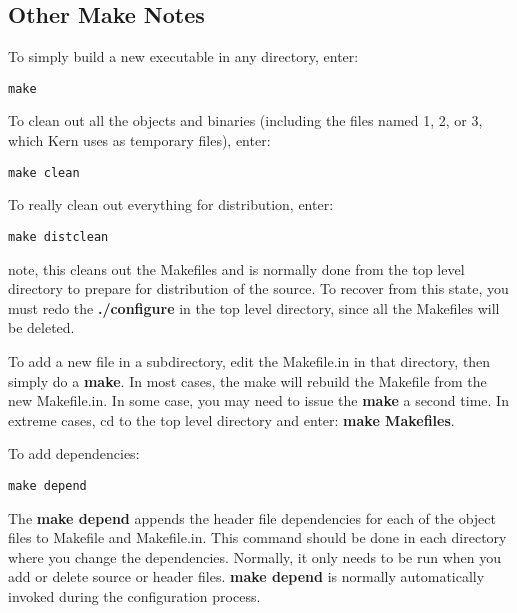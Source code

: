 {{{{{{{{{{\subsection*{Other Make Notes}

To simply build a new executable in any directory, enter: 

\footnotesize
\begin{verbatim}
make
\end{verbatim}
\normalsize

To clean out all the objects and binaries (including the files named 1, 2, or
3, which Kern uses as temporary files), enter: 

\footnotesize
\begin{verbatim}
make clean
\end{verbatim}
\normalsize

To really clean out everything for distribution, enter: 

\footnotesize
\begin{verbatim}
make distclean
\end{verbatim}
\normalsize

note, this cleans out the Makefiles and is normally done from the top level
directory to prepare for distribution of the source. To recover from this
state, you must redo the {\bf ./configure} in the top level directory, since
all the Makefiles will be deleted. 

To add a new file in a subdirectory, edit the Makefile.in in that directory,
then simply do a {\bf make}. In most cases, the make will rebuild the Makefile
from the new Makefile.in. In some case, you may need to issue the {\bf make} a
second time. In extreme cases, cd to the top level directory and enter: {\bf
make Makefiles}. 

To add dependencies: 

\footnotesize
\begin{verbatim}
make depend
\end{verbatim}
\normalsize

The {\bf make depend} appends the header file dependencies for each of the
object files to Makefile and Makefile.in. This command should be done in each
directory where you change the dependencies. Normally, it only needs to be run
when you add or delete source or header files. {\bf make depend} is normally
automatically invoked during the configuration process. 

}}}}}}}}}}
